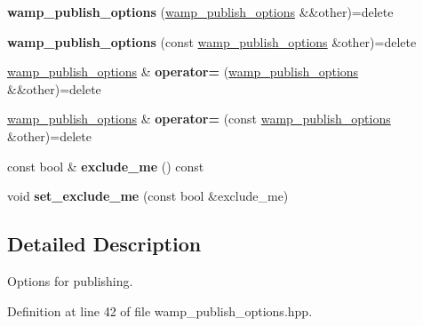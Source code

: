 \begin{DoxyCompactItemize}
\item 
{\bfseries wamp\+\_\+publish\+\_\+options} (\hyperlink{classautobahn_1_1wamp__publish__options}{wamp\+\_\+publish\+\_\+options} \&\&other)=delete\hypertarget{classautobahn_1_1wamp__publish__options_afc0f11a40515cb77c1b423d5ec95ab18}{}\label{classautobahn_1_1wamp__publish__options_afc0f11a40515cb77c1b423d5ec95ab18}

\item 
{\bfseries wamp\+\_\+publish\+\_\+options} (const \hyperlink{classautobahn_1_1wamp__publish__options}{wamp\+\_\+publish\+\_\+options} \&other)=delete\hypertarget{classautobahn_1_1wamp__publish__options_a987eee20209a49ecf3480e9770c47931}{}\label{classautobahn_1_1wamp__publish__options_a987eee20209a49ecf3480e9770c47931}

\item 
\hyperlink{classautobahn_1_1wamp__publish__options}{wamp\+\_\+publish\+\_\+options} \& {\bfseries operator=} (\hyperlink{classautobahn_1_1wamp__publish__options}{wamp\+\_\+publish\+\_\+options} \&\&other)=delete\hypertarget{classautobahn_1_1wamp__publish__options_af2b4b7ff246e5c761ab5f7b2f84173ca}{}\label{classautobahn_1_1wamp__publish__options_af2b4b7ff246e5c761ab5f7b2f84173ca}

\item 
\hyperlink{classautobahn_1_1wamp__publish__options}{wamp\+\_\+publish\+\_\+options} \& {\bfseries operator=} (const \hyperlink{classautobahn_1_1wamp__publish__options}{wamp\+\_\+publish\+\_\+options} \&other)=delete\hypertarget{classautobahn_1_1wamp__publish__options_ac9614a06cdd6dc90e3cb24a3a5833b8f}{}\label{classautobahn_1_1wamp__publish__options_ac9614a06cdd6dc90e3cb24a3a5833b8f}

\item 
const bool \& {\bfseries exclude\+\_\+me} () const \hypertarget{classautobahn_1_1wamp__publish__options_a7fb06211e7b0a2bab78742bb55b78ddb}{}\label{classautobahn_1_1wamp__publish__options_a7fb06211e7b0a2bab78742bb55b78ddb}

\item 
void {\bfseries set\+\_\+exclude\+\_\+me} (const bool \&exclude\+\_\+me)\hypertarget{classautobahn_1_1wamp__publish__options_aad04c3ddf7b784ca857d70db30ec7652}{}\label{classautobahn_1_1wamp__publish__options_aad04c3ddf7b784ca857d70db30ec7652}

\end{DoxyCompactItemize}


\subsection{Detailed Description}
Options for publishing. 

Definition at line 42 of file wamp\+\_\+publish\+\_\+options.\+hpp.


